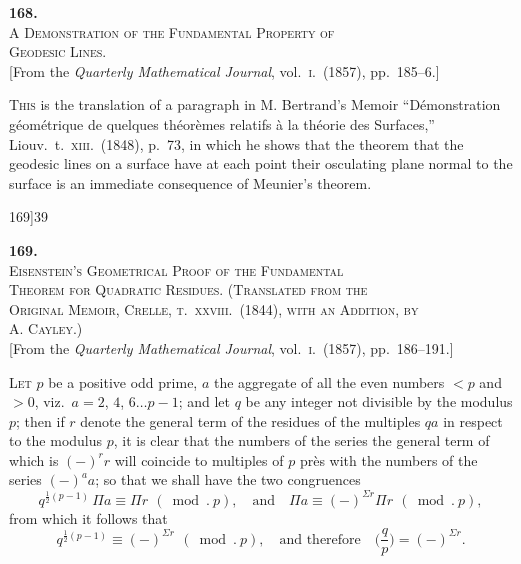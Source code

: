 \documentclass[11pt]{article}
\begin{document}
\bigskip

\begin{center}
{\large\textbf{168.}}\\[1em]
{\large\scshape A Demonstration of the Fundamental Property of\\ Geodesic Lines.}\\[1em]
{\small [From the \textit{Quarterly Mathematical Journal}, vol.~\textsc{i}.\ (1857), pp.~185--6.]}
\end{center}

\bigskip

\textsc{This} is the translation of a paragraph in M. Bertrand's Memoir ``D\'emonstration g\'eom\'etrique de quelques
th\'eor\`emes relatifs \`a la th\'eorie des Surfaces,'' Liouv.\ t.~\textsc{xiii}.\ (1848), p.~73, in which he shows that the theorem
that the geodesic lines on a surface have at each point their osculating plane normal to the surface is an
immediate consequence of Meunier's theorem.

\newpage

\begin{center}
\small 169]\hfill\textsc{39}
\end{center}

\bigskip

\begin{center}
{\large\textbf{169.}}\\[1em]
{\large\scshape Eisenstein's Geometrical Proof of the Fundamental\\ Theorem for Quadratic Residues. (Translated from the\\ Original Memoir, Crelle, t.~\textsc{xxviii}.\ (1844), with an Addition, by\\ A. Cayley.)}\\[1em]
{\small [From the \textit{Quarterly Mathematical Journal}, vol.~\textsc{i}.\ (1857), pp.~186--191.]}
\end{center}

\bigskip

\textsc{Let} $p$ be a positive odd prime, $a$ the aggregate of all the even numbers $< p$
and $> 0$, viz.\ $a = 2$, $4$, $6\ldots p - 1$; and let $q$ be any integer not divisible by the
modulus $p$; then if $r$ denote the general term of the residues of the multiples $qa$ in
respect to the modulus $p$, it is clear that the numbers of the series the general term
of which is $(-)^{r}r$ will coincide to multiples of $p$ pr\`es with the numbers of the series
$(-)^{a}a$; so that we shall have the two congruences
\[
q^{\tfrac{1}{2}(p-1)}\,\Pi a \equiv \Pi r\ \,(\bmod.\ p),\quad\text{and}\quad \Pi a \equiv (-)^{\Sigma r}\Pi r\ \,(\bmod.\ p),
\]
from which it follows that
\[
q^{\tfrac{1}{2}(p-1)} \equiv (-)^{\Sigma r}\ \,(\bmod.\ p),\quad\text{and therefore}\quad \biggl(\frac{q}{p}\biggr) = (-)^{\Sigma r}.
\]
\end{document}
